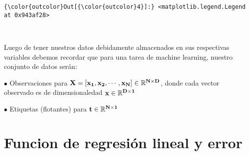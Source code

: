 \documentclass[11pt]{article}
\begin{document}
\begin{Verbatim}[commandchars=\\\{\}]
{\color{outcolor}Out[{\color{outcolor}4}]:} <matplotlib.legend.Legend at 0x943af28>
\end{Verbatim}
            
    \begin{center}
    \end{center}
    { \hspace*{\fill} \\}
    
    Luego de tener nuestros datos debidamente almacenados en sus respectivas
variables debemos recordar que para una tarea de machine learning,
nuestro conjunto de datos serán:

\(\bullet\) Observaciones para
\(\bf{X}=[\bf{x}_1,\bf{x}_2,\cdots, \bf{x}_N]\in \mathbb{R}^{N\times D}\),
donde cada vector observado es de dimensionaledad
\(\bf{x}\in \mathbb{R}^{D\times 1}\)

\(\bullet\) Etiquetas (flotantes) para
\(\bf{t}\in \mathbb{R}^{N\times 1}\)

    \section{Funcion de regresión lineal y
error}\label{funcion-de-regresiuxf3n-lineal-y-error}
\end{document}
